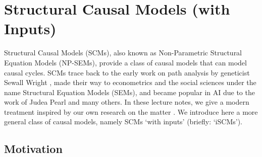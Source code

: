 \section{Structural Causal Models (with Inputs)}


Structural Causal Models (SCMs), also known as Non-Parametric Structural Equation Models (NP-SEMs), provide a class of causal models that can model causal cycles.
SCMs trace back to the early work on path analysis by geneticist Sewall Wright \cite{Wri21}, 
made their way to econometrics \cite{Wright1928,Haa43,StrotzWold1960} and the social sciences \cite{Bollen1989} under the name Structural Equation Models (SEMs), 
and became popular in AI due to the work of Judea Pearl \cite{Pearl09} and many others.
In these lecture notes, we give a modern treatment inspired by our own research on the matter \cite{BFPM21,FM20}.
We introduce here a more general class of causal models, namely SCMs `with inputs' (briefly: `iSCMs').

\subsection{Motivation}\label{sec:scms_motivation}

